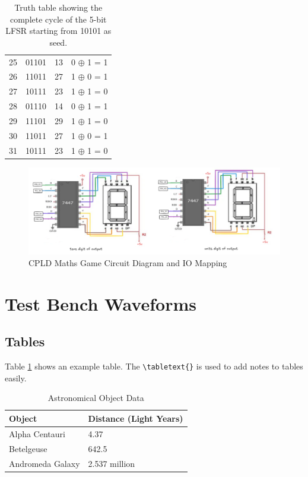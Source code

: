 \documentclass[10pt,a4paper,twocolumn,twoside]{tau-class/tau}
\begin{document}
\begin{table}[!t]
\begin{tabular}{|c|c|c|c|}
            25 & 01101 & 13 & 0 $\oplus$ 1 = 1 \\
            26 & 11011 & 27 & 1 $\oplus$ 0 = 1 \\
            27 & 10111 & 23 & 1 $\oplus$ 1 = 0 \\
            28 & 01110 & 14 & 0 $\oplus$ 1 = 1 \\
            29 & 11101 & 29 & 1 $\oplus$ 1 = 0 \\
            30 & 11011 & 27 & 1 $\oplus$ 0 = 1 \\
            31 & 10111 & 23 & 1 $\oplus$ 1 = 0 \\
            \hline
        \end{tabular}
    \caption{Truth table showing the complete cycle of the 5-bit LFSR starting from 10101 as seed.}
    \end{table}


    \begin{figure}[!t]
        \centering
        \includegraphics[width=.83\textwidth]{figures/circuit_diagram.png}
        \caption{CPLD Maths Game Circuit Diagram and IO Mapping}
        \label{fig:circuitdiagram}
    \end{figure}

\section{Test Bench Waveforms}

    \subsection{Tables}
	
        Table \ref{tab:table} shows an example table. The \verb|\tabletext{}| is used to add notes to tables easily. 
    		
        \begin{table}[H]
            \centering
            \caption{Astronomical Object Data}
            \label{tab:table}
            \begin{tabular}{ll}
                \toprule
                \textbf{Object} & \textbf{Distance (Light Years)} \\
                \midrule
                Alpha Centauri & 4.37 \\
                Betelgeuse & 642.5 \\
                Andromeda Galaxy & 2.537 million \\
                \bottomrule   
            \end{tabular}
			
			
        \end{table}
\end{document}
